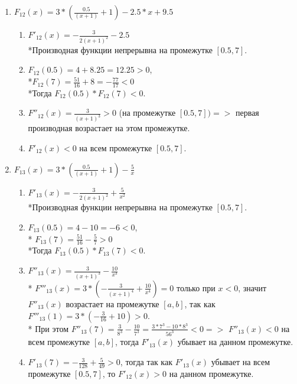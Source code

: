 \documentclass[a4paper,12pt,titlepage,finall]{article}
\begin{document}
\begin{enumerate}

    \item $F_{12}(x) = 3*(\frac{0.5}{(x+1)}+1) - 2.5*x + 9.5$
    \begin{enumerate}
        \item $F'_{12}(x) = -\frac{3}{2(x+1)^2}-2.5$
        \\*Производная функции непрерывна на промежутке $[0.5, 7]$.
        \item $F_{12}(0.5) = 4 + 8.25 = 12.25 > 0$,
        \\*$F_{12}(7) = \frac{51}{16} + 8 = -\frac{77}{17} < 0$
        \\*Тогда $F_{12}(0.5) * F_{12}(7) < 0$.
        \item $F''_{12}(x) = \frac{3}{(x+1)^3} > 0$ (на промежутке $[0.5, 7]) =>$ первая производная возрастает на этом промежутке.
        \item $F'_{12}(x) < 0$ на всем промежутке $[0.5, 7]$.
    \end{enumerate}
    
    \item $F_{13}(x) = 3*(\frac{0.5}{(x+1)}+1) - \frac{5}{x}$
    \begin{enumerate}
        \item $F'_{13}(x) = -\frac{3}{2(x+1)^2} + \frac{5}{x^2}$
        \\*Производная функции непрерывна на промежутке $[0.5, 7]$.
        \item $F_{13}(0.5) = 4 - 10 = -6 < 0$,
        \\* $F_{13}(7) = \frac{51}{16} - \frac{5}{7} > 0$
        \\*Тогда $F_{13}(0.5) * F_{13}(7) < 0$.
        \item $F''_{13}(x) = \frac{3}{(x+1)^3} - \frac{10}{x^3}$
        \\* $F'''_{13}(x) = 3*(-\frac{3}{(x+1)^4} + \frac{10}{x^4}) = 0$ только при $x < 0$, значит $F''_{13}(x)$ возрастает на промежутке $[a, b]$, так как  $F'''_{13}(1) = 3*(-\frac{3}{16} + 10) > 0$.
        \\* При этом $F''_{13}(7) = \frac{3}{8^3} - \frac{10}{7^3} = \frac{3*7^3 - 10*8^3}{56^3} < 0 =>$ $F''_{13}(x) < 0$ на всем промежутке $[a, b]$, тогда  $F'_{13}(x)$ убывает на данном промежутке.
        \item $F'_{13}(7) = -\frac{3}{128} + \frac{5}{49} > 0$, тогда так как $F'_{13}(x)$ убывает на всем промежутке $[0.5, 7]$, то  $F'_{12}(x) > 0$ на данном промежутке.
    \end{enumerate}
    

\end{enumerate}
\end{document}
